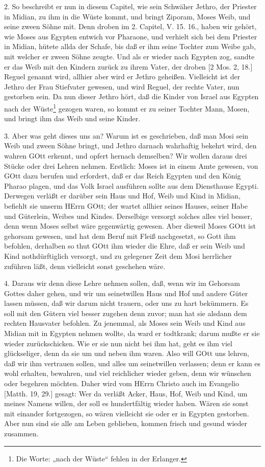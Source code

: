2. So beschreibt er nun in diesem Capitel, wie sein Schwäher Jethro, der Priester in Midian, zu ihm in die Wüste kommt, und bringt Ziporam, Moses Weib, und seine zween Söhne mit. Denn droben im 2. Capitel, V. 15. 16., haben wir gehört, wie Moses aus Egypten entwich vor Pharaone, und verhielt sich bei dem Priester in Midian, hütete allda der Schafe, bis daß er ihm seine Tochter zum Weibe gab, mit welcher er zween Söhne zeugte. Und als er wieder nach Egypten zog, sandte er das Weib mit den Kindern
zurück zu ihrem Vater, der droben [2 Mos. 2, 18.] Reguel genannt wird, allhier aber wird er Jethro geheißen. Vielleicht ist der Jethro der Frau Stiefvater gewesen, und wird Reguel, der rechte Vater, nun gestorben sein. Da nun dieser Jethro hört, daß die Kinder von Israel aus Egypten nach der Wüste\footnote{Die Worte: „nach der Wüste“ fehlen in der Erlanger.} gezogen waren, so kommt er zu seiner Tochter Mann, Mosen, und bringt ihm das Weib und seine Kinder.

3. Aber was geht dieses uns an? Warum ist es geschrieben, daß man Mosi sein Weib und zween Söhne bringt, und Jethro darnach wahrhaftig bekehrt wird, den wahren GOtt erkennt, und opfert hernach demselben? Wir wollen daraus drei Stücke oder drei Lehren nehmen. Erstlich: Moses ist in einem Amte gewesen, von GOtt dazu berufen und erfordert, daß er das Reich Egypten und den König Pharao plagen, und das Volk Israel ausführen sollte aus dem Diensthause Egypti. Derwegen verläßt er darüber sein Haus und Hof, Weib und Kind in Midian, befiehlt sie unserm HErrn GOtt; der wartet allhier seines Hauses, seiner Habe und Güterlein, Weibes und Kindes. Derselbige versorgt solches alles viel besser, denn wenn Moses selbst wäre gegenwärtig gewesen. Aber dieweil Moses GOtt ist gehorsam gewesen, und hat dem Beruf mit Fleiß nachgesetzt, so Gott ihm befohlen, derhalben so thut GOtt ihm wieder die Ehre, daß er sein Weib und Kind nothdürftiglich versorgt, und zu gelegener Zeit dem Mosi herrlicher zuführen läßt, denn vielleicht sonst geschehen wäre.

4. Daraus wir denn diese Lehre nehmen sollen, daß, wenn wir im Gehorsam Gottes daher gehen, und wir um seinetwillen Haus und Hof und andere Güter lassen müssen, daß wir darum nicht trauern, oder uns zu hart bekümmern. Es soll mit den Gütern viel besser zugehen denn zuvor; man hat sie alsdann dem rechten Hausvater befohlen. Zu jenemmal, als Moses sein Weib und Kind aus Midian mit in Egypten nehmen wollte, da ward er todtkrank; darum mußte er sie wieder zurückschicken. Wie er sie nun nicht bei ihm hat, geht es ihm viel glückseliger, denn da sie um und neben ihm waren. Also will GOtt uns lehren, daß wir ihm vertrauen sollen, und alles um seinetwillen verlassen; denn er kann es wohl erhalten, bewahren, und viel reichlicher wieder geben, denn wir wünschen oder begehren möchten. Daher wird vom HErrn Christo auch im Evangelio [Matth. 19, 29.] gesagt: Wer da verläßt Acker, Haus, Hof, Weib und Kind, um meines Namens willen, der soll es hundertfältig wieder haben. Wären sie sonst mit einander fortgezogen, so wären vielleicht sie oder er in Egypten gestorben. Aber nun sind sie alle am Leben geblieben, kommen frisch und gesund wieder zusammen.

